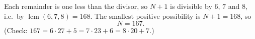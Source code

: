 Each remainder is one less than the divisor, so $N+1$ is divisible by $6$, $7$ and $8$, i.e.\ by $\operatorname{lcm}(6,7,8)=168$. The smallest positive possibility is $N+1=168$, so
\[
N=\boxed{167}.
\]
(Check: $167=6\cdot27+5=7\cdot23+6=8\cdot20+7$.)
